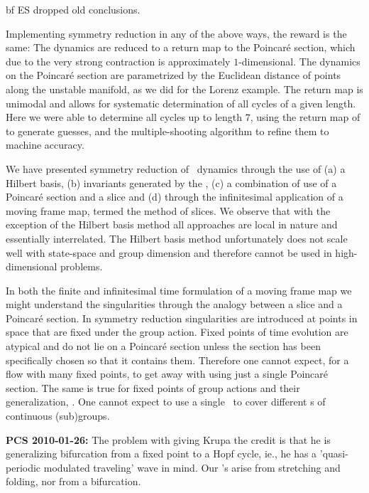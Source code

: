{bf ES dropped old conclusions.}

Implementing symmetry reduction in any of the above ways, the
reward is the same: The dynamics are reduced to a return map
to the Poincar\'e section, which due to the very strong
contraction is approximately $1$-dimensional. The dynamics on
the Poincar\'e section are parametrized by the Euclidean
distance of points along the unstable manifold, as we did for
the Lorenz example. The return map is unimodal and allows for
systematic determination of all cycles of a given length.
Here we were able to determine all cycles up to length $7$,
using the return map of  to generate
guesses, and the multiple-shooting algorithm
to refine them to machine accuracy.

We have presented symmetry reduction of \cLe\ dynamics through the use of
(a) a Hilbert basis,  (b) invariants generated by the {\mframes},
(c) a combination of use of a Poincar\'e section and a slice and (d) through
the infinitesimal application of a moving frame map, termed the method of
slices. We observe that with the exception of the Hilbert basis method all
approaches are local in nature and essentially interrelated. The Hilbert basis
method unfortunately does not scale well with state-space and group dimension
and therefore cannot be used in high-dimensional problems.

In both the finite and infinitesimal time formulation of a moving frame map
we might understand the singularities through the analogy between a slice
and a Poincar\'e section. In symmetry reduction singularities
are introduced at points in space that are fixed under the group action.
Fixed points of time evolution are atypical and do not lie on a Poincar\'e section
unless the section has been specifically chosen so that it contains them.
Therefore one cannot expect, for a flow with many fixed points, to
get away with using just a single Poincar\'e section. The same is
true for fixed points of group actions and their generalization, \fixedsp.
One cannot expect to use a single \slice\ to cover different \fixedsp s
of continuous (sub)groups.

{\bf PCS 2010-01-26:}
   The problem with giving Krupa the credit is that he is
   generalizing bifurcation from a fixed point to a Hopf
   cycle, ie., he has a 'quasi-periodic modulated traveling' wave in mind.
   Our \rpo's arise from stretching and folding, nor from a
   bifurcation.
